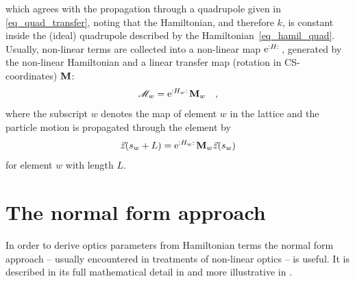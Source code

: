 which agrees with the propagation through a quadrupole given in \eqref{eq_quad_transfer},
noting that the Hamiltonian, and therefore $k$, is constant inside the (ideal) quadrupole described by the
Hamiltonian~\eqref{eq_hamil_quad}.
Usually, non-linear terms are collected into a non-linear map $\text{e}^{{:}H{:}\,}$, generated
by the non-linear Hamiltonian and a linear transfer map (rotation in CS-coordinates) $\mathbf{M}$:
%
\begin{equation}
    \mathscr{M}_w = \text{e}^{{:}H_w{:}\,} \mathbf{M}_w
    \quad ,
\end{equation}
%
where the subscript $w$ denotes the map of element $w$ in the lattice and the particle motion
is propagated through the element by
\begin{equation}
    \vec{z}(s_w + L) = \text{e}^{{:}H_w{:}\,} \mathbf{M}_w \vec{z}(s_w)
\end{equation}
for element $w$ with length $L$.
 


\section{The normal form approach}
\label{sec_normal_form}

In order to derive optics parameters from Hamiltonian terms the normal form approach
-- usually encountered in treatments of non-linear optics -- is useful.
It is described in its full mathematical detail in \cite{Bartolini1997,Bazzani1994}
and more illustrative in \cite{Tomas2005, Herr2013, Herr2020}.

